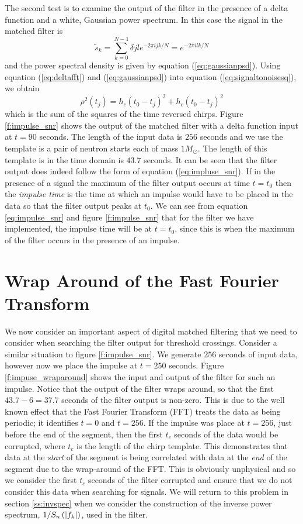 The second test is to examine the output of the filter in the presence of a
delta function and a white, Gaussian power spectrum. In this case the signal
in the matched filter is
\begin{equation}
\tilde{s}_k = \sum_{k=0}^{N-1} \delta{jl} e^{-2\pi ijk/N} = e^{-2\pi ilk/N}
\label{eq:deltafft}
\end{equation}
and the power spectral density is given by equation (\ref{eq:gaussianpsd}).
Using equation (\ref{eq:deltafft}) and (\ref{eq:gaussianpsd}) into equation
(\ref{eq:signaltonoisesq}), we obtain
\begin{equation}
\rho^2(t_j) = h_c(t_0 - t_j)^2 + h_c(t_0 - t_j)^2
\label{eq:impulse_snr}
\end{equation}
which is the sum of the squares of the time reversed chirps.  Figure
\ref{f:impulse_snr} shows the output of the matched filter with a delta
function input at $t=90$ seconds. The length of the input data is $256$
seconds and we use the template is a pair of neutron starts each of
mass $1 M_\odot$. The length of this template is in the time domain is $43.7$
seconds.  It can be seen that the filter output does indeed follow the form of
equation (\ref{eq:impluse_snr}). If in the presence of a signal
the maximum of the filter output occurs at time $t = t_0$ then the
\emph{impulse time} is the time at which an impulse would have to be placed in
the data so that the filter output peaks at $t_0$. We can see from equation
\ref{eq:impulse_snr} and figure \ref{f:impulse_snr} that for the filter we
have implemented, the impulse time will be at $t = t_0$, since this is when
the maximum of the filter occurs in the presence of an impulse.

\section{Wrap Around of the Fast Fourier Transform}
\label{s:wraparound}

We now consider an important aspect of digital matched filtering that we need
to consider when searching the filter output for threshold crossings. Consider
a similar situation to figure \ref{f:impulse_snr}. We generate $256$ seconds of
input data, however now we place the impulse at $t = 250$ seconds. Figure
\ref{f:impuse_wraparound} shows the input and output of the filter for such an
impulse. Notice that the output of the filter wraps around, so that the first 
$43.7-6 = 37.7$ seconds of the filter output is non-zero. This is due to the
well known effect that the Fast Fourier Transform (FFT) treats the data as being
periodic; it identifies $t=0$ and $t=256$. If the impulse was
place at $t=256$, just before the end of the segment, then the first $t_c$
seconds of the data would be corrupted, where $t_c$ is the length of the chirp
template. This demonstrates that data at the \emph{start} of the segment is
being correlated with data at the \emph{end} of the segment due to the
wrap-around of the FFT. This is obviously unphysical and so we consider the
first $t_c$ seconds of the filter corrupted and ensure that we do not consider
this data when searching for signals. We will return to this problem in section
\ref{ss:invspec} when we consider the construction of the inverse power
spectrum, $1/S_n\left(\left|f_{k}\right|\right)$, used in the filter.

